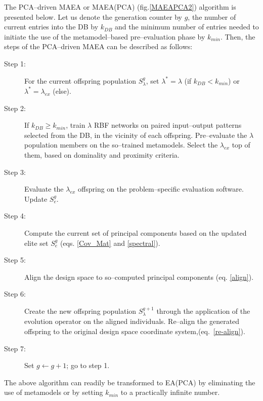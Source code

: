 The PCA--driven MAEA or MAEA(PCA) (fig.\ref{MAEAPCA2}) algorithm is presented below. 
Let us denote the generation counter by $g$, the number of current entries into the DB by $k_{DB}$ and the minimum number of entries needed to initiate the use of the metamodel--based pre--evaluation phase by $k_{min}$. Then, the steps of the PCA--driven MAEA can be described as follows:
\begin{description}
  \item[Step 1:] For the current offspring population $S^{g}_\lambda$, set $\lambda^*\!=\!\lambda$ (if $k_{DB}\!<\!k_{min}$) or  $\lambda^*\!=\!\lambda_{ex}$ (else). 
  \item[Step 2:] If $k_{DB}\!\ge\!k_{min}$, train $\lambda$ RBF networks on paired input--output patterns selected from the DB, in the vicinity of each offspring. Pre--evaluate the $\lambda$ population members on the so--trained metamodels. Select the $\lambda_{ex}$ top of them, based on dominality and proximity criteria.
  \item[Step 3:] Evaluate the $\lambda_{ex}$ offspring on the problem--specific evaluation software. Update $S^{g}_e$.
  \item[Step 4:] Compute the current set of principal components based on the updated elite set $S^{g}_e$ (eqs. \ref{Cov_Mat} and \ref{spectral}).
  \item[Step 5:] Align the design space to so--computed principal components (eq. \ref{align}). 
  \item[Step 6:] Create the new offspring population $S^{g+1}_\lambda$ through the application of the evolution operator on the aligned individuals. Re--align the generated offspring to the original design space coordinate system,(eq.~\ref{re-align}).
  \item[Step 7:] Set $g\!\leftarrow\!g\!+\!1$; go to step 1.
\end{description}
The above algorithm can readily be transformed to EA(PCA) by eliminating the use of metamodels or by setting $k_{min}$ to a practically infinite number.  
